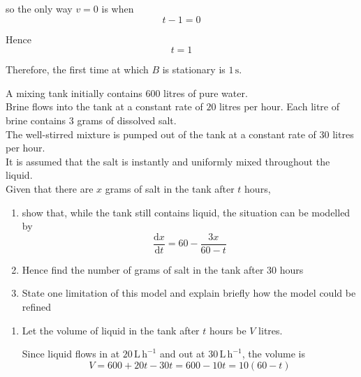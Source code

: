 \documentclass[leqno]{article}
\begin{document}
\begin{enumerate}[
  label=\textbf{\arabic*.},
  leftmargin=*,
  topsep=0pt,
  partopsep=0pt,
  parsep=0pt
]
\begin{djsSolution}
\begin{enumerate}[label=\textbf{(\alph*)}]
  so the only way $v=0$ is when
  \[
  t-1=0
  \]

  Hence
  \[
  t=1
  \]

  Therefore, the first time at which $B$ is stationary is $1\,\mathrm{s}$.
\end{enumerate}
\end{djsSolution}


\newpage

\questionitem

A mixing tank initially contains $600$ litres of pure water. \\

Brine flows into the tank at a constant rate of $20$ litres per hour. Each litre of brine contains $3$ grams of dissolved salt. \\

The well-stirred mixture is pumped out of the tank at a constant rate of $30$ litres per hour. \\

It is assumed that the salt is instantly and uniformly mixed throughout the liquid. \\

Given that there are $x$ grams of salt in the tank after $t$ hours, \\
\begin{enumerate}[label=\textbf{(\alph*)}]
  \item show that, while the tank still contains liquid, the situation can be modelled by
  \[
  \frac{\mathrm{d}x}{\mathrm{d}t}=60-\frac{3x}{60-t}
  \] 
  \item Hence find the number of grams of salt in the tank after $30$ hours  \\
  \item State one limitation of this model and explain briefly how the model could be refined  \\
\end{enumerate}

\vspace*{10pt}

\begin{djsSolution}
\begin{enumerate}[label=\textbf{(\alph*)}]
  \item Let the volume of liquid in the tank after $t$ hours be $V$ litres.

  Since liquid flows in at $20\,\mathrm{L\,h^{-1}}$ and out at $30\,\mathrm{L\,h^{-1}}$, the volume is
  \[
  V=600+20t-30t=600-10t=10(60-t)
  \]


\end{enumerate}
\end{djsSolution}
\end{enumerate}
\end{document}
